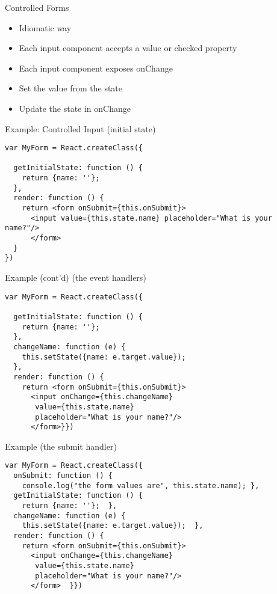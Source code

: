 \documentclass[presentation]{beamer}
\begin{document}
\begin{frame}[label=sec-8]{Controlled Forms}
\begin{itemize}
\item Idiomatic way
\item Each input component accepts a value or checked property
\item Each input component exposes onChange
\item Set the value from the state
\item Update the state in onChange
\end{itemize}
\end{frame}

\begin{frame}[fragile,label=sec-9]{Example: Controlled Input (initial state)}
 \begin{verbatim}
var MyForm = React.createClass({

  getInitialState: function () {
    return {name: ''};
  },
  render: function () {
    return <form onSubmit={this.onSubmit}>
      <input value={this.state.name} placeholder="What is your name?"/>
      </form>
  }
})
\end{verbatim}
\end{frame}

\begin{frame}[fragile,label=sec-10]{Example (cont'd) (the event handlers)}
 \begin{verbatim}
var MyForm = React.createClass({

  getInitialState: function () {
    return {name: ''};
  },
  changeName: function (e) {
    this.setState({name: e.target.value});
  },
  render: function () {
    return <form onSubmit={this.onSubmit}>
      <input onChange={this.changeName}
       value={this.state.name}
       placeholder="What is your name?"/>
      </form>}})
\end{verbatim}
\end{frame}

\begin{frame}[fragile,label=sec-11]{Example (the submit handler)}
 \begin{verbatim}
var MyForm = React.createClass({
  onSubmit: function () {
    console.log("the form values are", this.state.name); },
  getInitialState: function () {
    return {name: ''};  },
  changeName: function (e) {
    this.setState({name: e.target.value});  },
  render: function () {
    return <form onSubmit={this.onSubmit}>
      <input onChange={this.changeName}
       value={this.state.name}
       placeholder="What is your name?"/>
      </form>  }})
\end{verbatim}
\end{frame}
\end{document}
